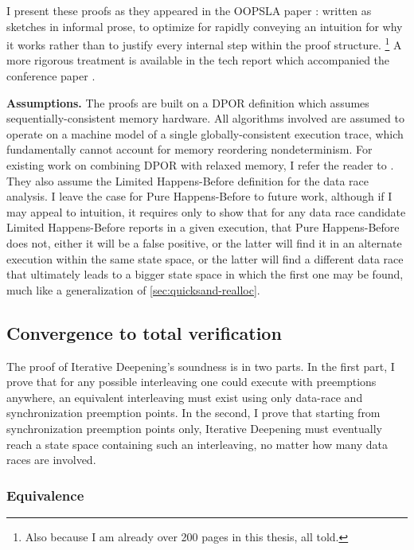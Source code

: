 I present these proofs as they appeared in the OOPSLA paper \cite{quicksand}:
written as sketches in informal prose,
to optimize for rapidly conveying an intuition for why it works
rather than to justify every internal step within the proof structure.%
\footnote{Also because I am already over 200 pages in this thesis, all told.}
A more rigorous treatment
is available in the tech report which accompanied the conference paper \cite{quicksand-soundness}.

{\bf Assumptions.}
The proofs are built on a DPOR definition which assumes sequentially-consistent memory hardware.
All algorithms involved are assumed to operate on a machine model of a single globally-consistent execution trace,
which fundamentally cannot account for memory reordering nondeterminism.
For existing work on combining DPOR with relaxed memory, I refer the reader to \cite{tsopso}.
They also assume the Limited Happens-Before definition
for the data race analysis.
I leave the case for Pure Happens-Before to future work,
although if I may appeal to intuition,
it requires only to show that for any data race candidate
Limited Happens-Before reports in a given execution,
that Pure Happens-Before does not,
either it will be a false positive,
or the latter will find it in an alternate execution within the same state space,
or the latter will find a different data race that ultimately leads to a bigger state space in which the first one may be found,
much like a generalization of \cref{sec:quicksand-realloc}.

\subsection{Convergence to total verification}
\label{sec:quicksand-convergence}

The proof of Iterative Deepening's soundness is in two parts.
In the first part, I prove that for any possible interleaving
one could execute with preemptions anywhere,
an equivalent interleaving must exist using only data-race and synchronization preemption points.
In the second, I prove that starting from synchronization preemption points only,
Iterative Deepening must eventually reach a state space containing such an interleaving,
no matter how many data races are involved.

\subsubsection{Equivalence}

